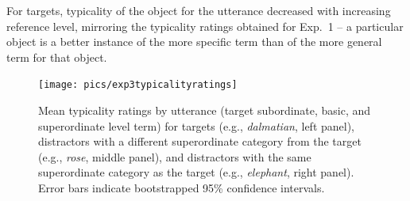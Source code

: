 \documentclass[11pt]{article}
\begin{document}
For targets, typicality of the object for the utterance decreased with increasing reference level, mirroring the typicality ratings obtained for Exp.~1 -- a particular object is a better instance of the more specific term than of the more general term for that object.

\begin{figure}[h!]
\centering
\texttt{[image: pics/exp3typicalityratings]}
\caption{Mean typicality ratings by utterance (target subordinate, basic, and superordinate level term) for targets (e.g., \emph{dalmatian}, left panel), distractors with a different superordinate category from the target (e.g., \emph{rose}, middle panel), and distractors with the same superordinate category as the target (e.g., \emph{elephant}, right panel). Error bars indicate bootstrapped 95\% confidence intervals.}
\label{fig:typicalityboxplots}
\end{figure}
\end{document}
